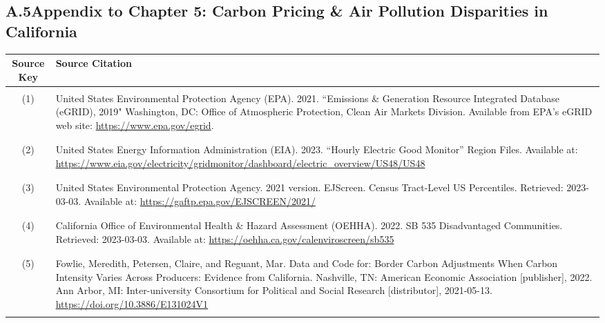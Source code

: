 \newpage
\subsection*{A.5\quad Appendix to Chapter 5: Carbon Pricing \& Air Pollution Disparities in California}

\begin{center}
    \singlespacing
    \renewcommand{\arraystretch}{1.5}
    \small
    \begin{longtable}{c L{0.8\textwidth}}
        \hline\hline
        Source Key & Source Citation\\
        \hline \\[-3ex]
        (1) & United States Environmental Protection Agency (EPA). 2021. ``Emissions \& Generation Resource Integrated Database (eGRID), 2019" Washington, DC: Office of Atmospheric Protection, Clean Air Markets Division. Available from EPA's eGRID web site: \url{https://www.epa.gov/egrid}.\\ \\[-3ex]
        \hline \\[-3ex]
        (2) & United States Energy Information Administration (EIA). 2023. ``Hourly Electric Good Monitor'' Region Files. Available at: \url{https://www.eia.gov/electricity/gridmonitor/dashboard/electric_overview/US48/US48}\\ \\[-3ex]
        \hline \\[-3ex]
        (3) & United States Environmental Protection Agency. 2021 version. EJScreen. Census Tract-Level US Percentiles. Retrieved: 2023-03-03. Available at: \url{https://gaftp.epa.gov/EJSCREEN/2021/} \\ \\[-3ex]
        \hline \\[-3ex]
        (4) & California Office of Environmental Health \& Hazard Assessment (OEHHA). 2022. SB 535 Disadvantaged Communities. Retrieved: 2023-03-03. Available at: \url{https://oehha.ca.gov/calenviroscreen/sb535} \\ \\[-3ex]
        \hline \\[-3ex]
        (5) & Fowlie, Meredith, Petersen, Claire, and Reguant, Mar. Data and Code for: Border Carbon Adjustments When Carbon Intensity Varies Across Producers: Evidence from California. Nashville, TN: American Economic Association [publisher], 2022. Ann Arbor, MI: Inter-university Consortium for Political and Social Research [distributor], 2021-05-13. \url{https://doi.org/10.3886/E131024V1} \\ \\[-3ex]

\end{longtable}
\end{center}
